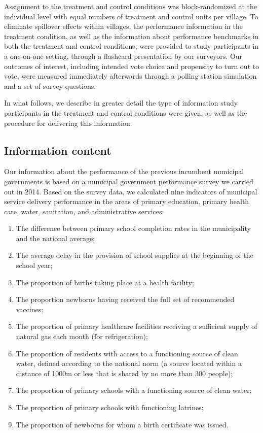 \documentclass[11pt]{article}
\begin{document}
Assignment to the treatment and control conditions was block-randomized at the individual level with equal numbers of treatment and control units per village. To eliminate spillover effects within villages, the performance information in the treatment condition, as well as the information about performance benchmarks in both the treatment and control conditions, were provided to study participants in a one-on-one setting, through a flashcard presentation by our surveyors. Our outcomes of interest, including intended vote choice and propensity to turn out to vote, were measured immediately afterwards through a polling station simulation and a set of survey questions. 

In what follows, we describe in greater detail the type of information study participants in the treatment and control conditions were given, as well as the procedure for delivering this information. 

\subsection{Information content}

Our information about the performance of the previous incumbent municipal governments is based on a municipal government performance survey we carried out in 2014. Based on the survey data, we calculated nine indicators of municipal service delivery performance in the areas of primary education, primary health care, water, sanitation, and administrative services: 
\begin{enumerate}
\item The difference between primary school completion rates in the municipality and the national average;
\item The average delay in the provision of school supplies at the beginning of the school year;
\item The proportion of births taking place at a health facility;
\item The proportion newborns having received the full set of recommended vaccines;
\item The proportion of primary healthcare facilities receiving a sufficient supply of natural gas each month (for refrigeration);
\item The proportion of residents with access to a functioning source of clean water, defined according to the national norm (a source located within a distance of 1000m or less that is shared by no more than 300 people);
\item The proportion of primary schools with a functioning source of clean water;
\item The proportion of primary schools with functioning latrines;
\item The proportion of newborns for whom a birth certificate was issued.
\end{enumerate}
\end{document}
